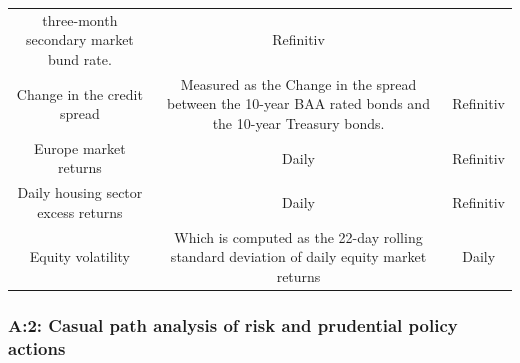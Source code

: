 \documentclass[
  10pt,
]{article}
\begin{document}
\begin{longtable}[]{@{}ccc@{}}
\begin{minipage}[t]{0.32\columnwidth}
three-month secondary market bund rate.\strut
\end{minipage} & \begin{minipage}[t]{0.24\columnwidth}\centering
Refinitiv\strut
\end{minipage}\tabularnewline
\begin{minipage}[t]{0.36\columnwidth}\centering
Change in the credit spread\strut
\end{minipage} & \begin{minipage}[t]{0.32\columnwidth}\centering
Measured as the Change in the spread between the 10-year BAA rated bonds
and the 10-year Treasury bonds.\strut
\end{minipage} & \begin{minipage}[t]{0.24\columnwidth}\centering
Refinitiv\strut
\end{minipage}\tabularnewline
\begin{minipage}[t]{0.36\columnwidth}\centering
Europe market returns\strut
\end{minipage} & \begin{minipage}[t]{0.32\columnwidth}\centering
Daily\strut
\end{minipage} & \begin{minipage}[t]{0.24\columnwidth}\centering
Refinitiv\strut
\end{minipage}\tabularnewline
\begin{minipage}[t]{0.36\columnwidth}\centering
Daily housing sector excess returns\strut
\end{minipage} & \begin{minipage}[t]{0.32\columnwidth}\centering
Daily\strut
\end{minipage} & \begin{minipage}[t]{0.24\columnwidth}\centering
Refinitiv\strut
\end{minipage}\tabularnewline
\begin{minipage}[t]{0.36\columnwidth}\centering
Equity volatility\strut
\end{minipage} & \begin{minipage}[t]{0.32\columnwidth}\centering
Which is computed as the 22-day rolling standard deviation of daily
equity market returns\strut
\end{minipage} & \begin{minipage}[t]{0.24\columnwidth}\centering
Daily\strut
\end{minipage}\tabularnewline
\bottomrule
\end{longtable}

\hypertarget{a2-casual-path-analysis-of-risk-and-prudential-policy-actions}{%
\subsubsection{A:2: Casual path analysis of risk and prudential policy
actions}\label{a2-casual-path-analysis-of-risk-and-prudential-policy-actions}}
\end{document}
